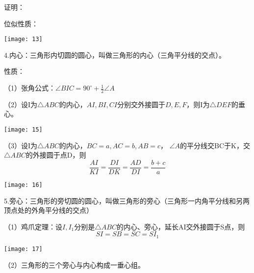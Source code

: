证明：
\begin{figure}[H]
    \centering  
\end{figure}

位似性质：
\begin{center}
    \texttt{[image: 13]}
\end{center}
\newpage
4.内心：三角形内切圆的圆心，叫做三角形的内心（三角平分线的交点）。

性质：

（1）张角公式：$\angle{BIC}=90^{\circ}+\frac{1}{2}\angle{A}$


（2）设I为$\bigtriangleup ABC$的内心，$AI,BI,CI$分别交外接圆于$D,E,F$，则I为$\bigtriangleup{DEF}$的垂心。
\begin{center}
    \texttt{[image: 15]}
\end{center}

（3）设I为$\bigtriangleup ABC$的内心，$BC=a,AC=b,AB=c$，
$\angle{A}$的平分线交BC于K，交$\bigtriangleup ABC$的外接圆于点D，则
\[
    \frac{AI}{KI}=\frac{DI}{DK}=\frac{AD}{DI}=\frac{b+c}{a}
\]
\begin{center}
    \texttt{[image: 16]}
\end{center}

5.旁心：三角形的旁切圆的圆心，叫做三角形的旁心（三角形一内角平分线和另两顶点处的外角平分线的交点）

（1）鸡爪定理：设$I,I_1$分别是$\bigtriangleup{ABC}$的内心、旁心，延长AI交外接圆于S点，则
$$SI=SB=SC=SI_1$$
\begin{center}
    \texttt{[image: 17]}
\end{center}

（2）三角形的三个旁心与内心构成一垂心组。
\begin{figure}[H]
        \centering  
        \subfigure{
                \texttt{[image: 18]}}
        \subfigure{
                \texttt{[image: 19]}}
\end{figure}

